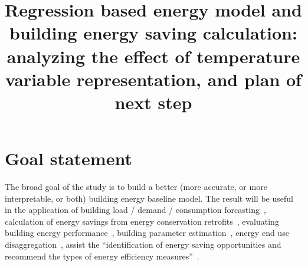 \documentclass[12pt]{article}
\begin{document}
\title{Regression based energy model and building energy saving calculation: analyzing the effect of temperature variable representation, and plan of next step}
\maketitle
\tableofcontents
\newpage
\section{Goal statement}
The broad goal of the study is to build a better (more accurate, or
more interpretable, or both) building energy baseline model.  The
result will be useful in the application of building load / demand /
consumption forcasting~\cite{dong2005applying, solomon2011forecasting,
  Yu20101637, mocanu2016deep, hammarsten1987critical}, calculation of
energy savings from energy conservation retrofits~\cite{haberl1994bin,
  edition2013ashrae, kissock2008methodology, kissock2003,
  fels1986prism}, evaluating building energy
performance~\cite{abushakra1997inverse}, building parameter
estimation~\cite{hammarsten1987critical}, energy end use
disaggregation~\cite{leanEng, fels1986prism, wytock2013contextually},
assist the ``identification of energy saving opportunities and
recommend the types of energy efficiency measures''~\cite{leanEng}.
\end{document}

